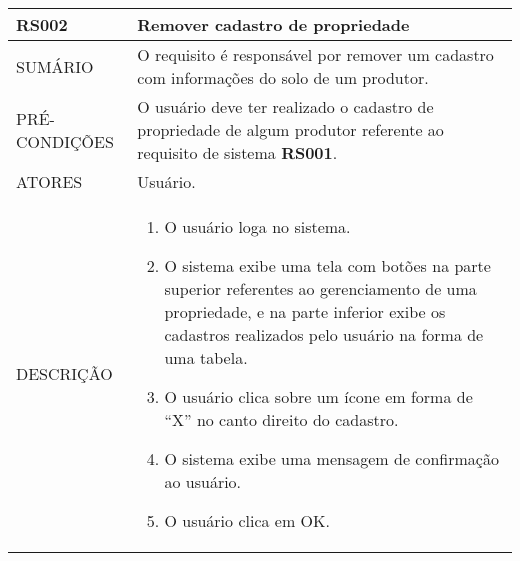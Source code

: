 \begin{longtable}[c]{@{}|p{4cm}|p{9cm}|@{}}
\hline
\begin{minipage}[t]{0.47\columnwidth}
\textbf{RS002}
\end{minipage} & \begin{minipage}[t]{0.47\columnwidth}
Remover cadastro de propriedade
\end{minipage}
\\\hline
\begin{minipage}[t]{0.47\columnwidth}
SUMÁRIO
\end{minipage} & \begin{minipage}[t]{0.47\columnwidth}
O requisito é responsável por remover um cadastro com informações do
solo de um produtor.
\end{minipage}
\\\hline
\begin{minipage}[t]{0.47\columnwidth}
PRÉ-CONDIÇÕES
\end{minipage} & \begin{minipage}[t]{0.47\columnwidth}
O usuário deve ter realizado o cadastro de propriedade de algum produtor
referente ao requisito de sistema \textbf{RS001}.
\end{minipage}
\\\hline
\begin{minipage}[t]{0.47\columnwidth}
ATORES
\end{minipage} & \begin{minipage}[t]{0.47\columnwidth}
Usuário.
\end{minipage}
\\\hline
\begin{minipage}[t]{0.47\columnwidth}
DESCRIÇÃO
\end{minipage} & \begin{minipage}[t]{0.47\columnwidth}
\begin{enumerate}
\def\labelenumi{\arabic{enumi}.}
\itemsep1pt\parskip0pt\parsep0pt
\item
  O usuário loga no sistema.
\item
  O sistema exibe uma tela com botões na parte superior referentes ao
  gerenciamento de uma propriedade, e na parte inferior exibe os
  cadastros realizados pelo usuário na forma de uma tabela.
\item
  O usuário clica sobre um ícone em forma de ``X'' no canto direito do
  cadastro.
\item
  O sistema exibe uma mensagem de confirmação ao usuário.
\item
  O usuário clica em OK.

\end{enumerate}
\end{minipage}
\end{longtable}
